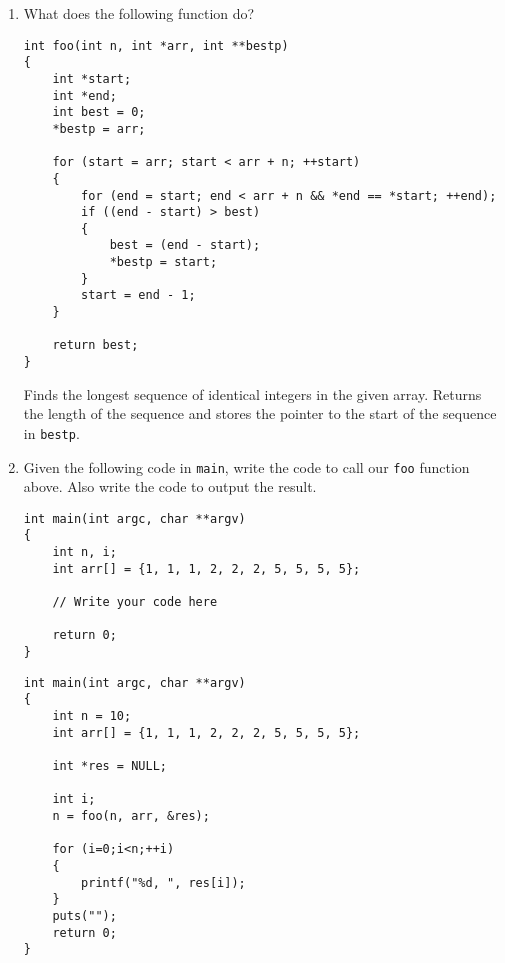 %
%


\begin{enumerate}
\item What does the following function do?

\begin{lstlisting}
int foo(int n, int *arr, int **bestp)
{
	int *start;
	int *end;
	int best = 0;
	*bestp = arr;
	
	for (start = arr; start < arr + n; ++start)
	{
		for (end = start; end < arr + n && *end == *start; ++end);
		if ((end - start) > best)
		{
			best = (end - start);
			*bestp = start;
		}
		start = end - 1;
	}
	
	return best;
}
\end{lstlisting}

\begin{answer}
Finds the longest sequence of identical integers in the given array.
Returns the length of the sequence and stores the pointer to the start of the sequence in \texttt{bestp}.
\end{answer}

\item Given the following code in \texttt{main}, write the code to call our \texttt{foo} function above.
Also write the code to output the result.
\begin{lstlisting}[numbers=none]
int main(int argc, char **argv)
{
	int n, i;
	int arr[] = {1, 1, 1, 2, 2, 2, 5, 5, 5, 5};

	// Write your code here

	return 0;
}
\end{lstlisting}

\begin{answer}
\begin{lstlisting}
int main(int argc, char **argv)
{
	int n = 10;
	int arr[] = {1, 1, 1, 2, 2, 2, 5, 5, 5, 5};

	int *res = NULL;

	int i;
	n = foo(n, arr, &res);

	for (i=0;i<n;++i)
	{
		printf("%d, ", res[i]);
	}
	puts("");
	return 0;
}
\end{lstlisting}
\end{answer}
\end{enumerate}
